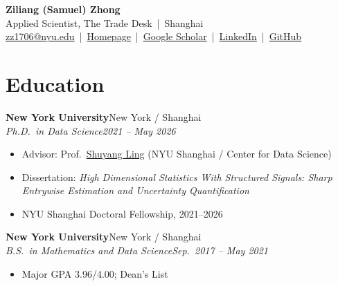 \documentclass[letterpaper,11pt]{article}
\newcommand{\entry}[4]{\par\vspace{2pt}\hspace*{0.8em}\textbf{#1}\hfill #2\\\hspace*{0.8em}\textit{#3}\hfill\textit{#4}\par}
\begin{document}
\begin{center}
{\Huge\bfseries Ziliang (Samuel) Zhong}\\[5pt]
Applied Scientist, The Trade Desk \,|\, Shanghai\\[2pt]
\href{mailto:zz1706@nyu.edu}{zz1706@nyu.edu} \,|\,
\href{https://samzhong0702.github.io}{Homepage} \,|\,
\href{https://scholar.google.com/citations?user=S-rSjJAAAAAJ}{Google Scholar} \,|\,
\href{https://www.linkedin.com/in/ziliang-zhong-459412179/}{LinkedIn} \,|\,
\href{https://github.com/samzhong0702}{GitHub}
\end{center}

\section*{Education}
\entry{New York University}{New York / Shanghai}{Ph.D.\ in Data Science}{2021 -- May 2026}
\begin{itemize}
  \item Advisor: Prof.\ \href{https://cims.nyu.edu/~sling/index.html}{Shuyang Ling} (NYU Shanghai / Center for Data Science)
  \item Dissertation: \textit{High Dimensional Statistics With Structured Signals: Sharp Entrywise Estimation and Uncertainty Quantification}
  \item NYU Shanghai Doctoral Fellowship, 2021--2026
\end{itemize}
\entry{New York University}{New York / Shanghai}{B.S.\ in Mathematics and Data Science}{Sep.\ 2017 -- May 2021}
\begin{itemize}
  \item Major GPA 3.96/4.00; Dean's List
\end{itemize}
\end{document}
